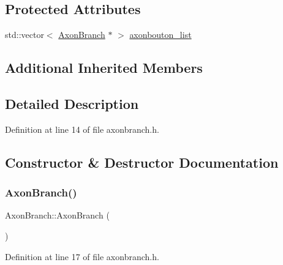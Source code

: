 \subsection*{Protected Attributes}
\begin{DoxyCompactItemize}
\item 
std\+::vector$<$ \mbox{\hyperlink{class_axon_branch}{Axon\+Branch}} $\ast$ $>$ \mbox{\hyperlink{class_axon_branch_a43224f9fcb62274709438c9833cb10e5}{axonbouton\+\_\+list}}
\end{DoxyCompactItemize}
\subsection*{Additional Inherited Members}


\subsection{Detailed Description}


Definition at line 14 of file axonbranch.\+h.



\subsection{Constructor \& Destructor Documentation}
\mbox{\label{class_axon_branch_a5bb6ccef8d94c937a85148af932221c0}} 
\subsubsection{\texorpdfstring{Axon\+Branch()}{AxonBranch()}\hspace{0.1cm}{\footnotesize\ttfamily [1/4]}}
{\footnotesize\ttfamily Axon\+Branch\+::\+Axon\+Branch (\begin{DoxyParamCaption}{ }\end{DoxyParamCaption})\hspace{0.3cm}{\ttfamily [inline]}}



Definition at line 17 of file axonbranch.\+h.

\mbox{\label{class_axon_branch_a67618605ac3731556ab48a6583e21ba8}} 
